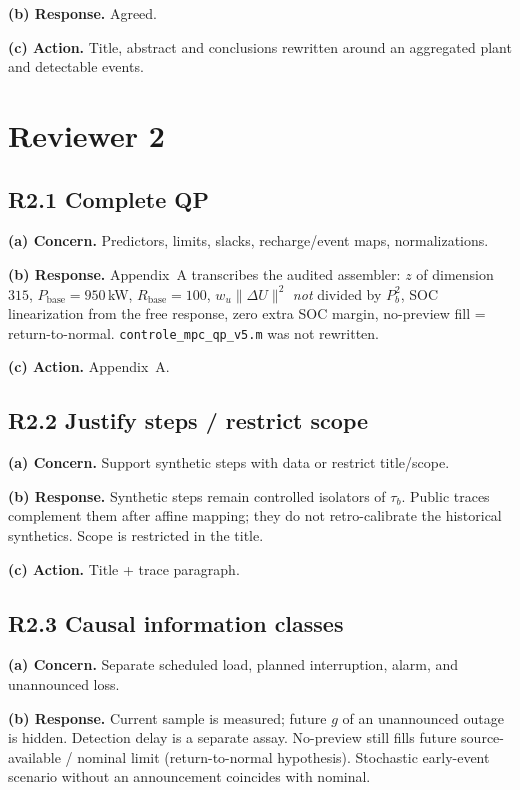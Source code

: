 \documentclass[11pt]{article}
\begin{document}
\textbf{(b) Response.} Agreed.

\textbf{(c) Action.} Title, abstract and conclusions rewritten around an aggregated plant and detectable events.

\section*{Reviewer 2}

\subsection*{R2.1 Complete QP}
\textbf{(a) Concern.} Predictors, limits, slacks, recharge/event maps, normalizations.

\textbf{(b) Response.} Appendix~A transcribes the audited assembler: $z$ of dimension $315$, $P_{\mathrm{base}}=950$\,kW, $R_{\mathrm{base}}=100$, $w_u\|\Delta U\|^2$ \emph{not} divided by $P_b^2$, SOC linearization from the free response, zero extra SOC margin, no-preview fill = return-to-normal. \texttt{controle\_mpc\_qp\_v5.m} was not rewritten.

\textbf{(c) Action.} Appendix~A.

\subsection*{R2.2 Justify steps / restrict scope}
\textbf{(a) Concern.} Support synthetic steps with data or restrict title/scope.

\textbf{(b) Response.} Synthetic steps remain controlled isolators of $\tau_b$. Public traces complement them after affine mapping; they do not retro-calibrate the historical synthetics. Scope is restricted in the title.

\textbf{(c) Action.} Title + trace paragraph.

\subsection*{R2.3 Causal information classes}
\textbf{(a) Concern.} Separate scheduled load, planned interruption, alarm, and unannounced loss.

\textbf{(b) Response.} Current sample is measured; future $g$ of an unannounced outage is hidden. Detection delay is a separate assay. No-preview still fills future source-available / nominal limit (return-to-normal hypothesis). Stochastic early-event scenario without an announcement coincides with nominal.
\end{document}
